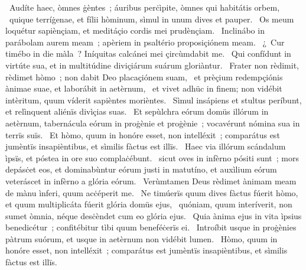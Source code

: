 \psalmChapterWithInscription{}
{ }
{%
~Audíte haec, òmnes ġèntes~; áuribus perċìpite, òmnes qui habitátis orbem, 
~quique terríġenae, et fílii hòminum, sìmul in unum dives et pauper. 
~Os meum loquétur sapiènçiam, et meditáçio cordis mei prudènçiam. 
~Inclinábo in parábolam aurem meam~; apèriem in psaltério proposiçiónem meam. 
~¿~Cur timébo in die màla~? Iníquitas calcánei mei çircùmdabit me. 
~Qui confídunt in virtúte sua, et in multitúdine diviçiárum suárum gloriàntur. 
~Frater non rèdimit, rèdimet hòmo~; non dabit Deo placaçiónem suam, 
~et prèçium redempçiónis ànimae suae, et laborábit in aetèrnum, 
~et vivet adhüc in finem; non vidébit intèritum, quum víderit sapièntes morièntes. 
~Sìmul insápiens et stultus períbunt, et relìnquent aliénïs divìçias suas. 
~Et sepùlchra eórum domüs illórum in aetèrnum, tabernácula eórum in proġènie et proġènie~; vocavérunt nómina sua in terrïs suïs. 
~Et hòmo, quum in honóre esset, non intelléxit~; comparátus est jumèntïs insapièntibus, et sìmilis fàctus est illïs. 
~Haec via illórum scándalum ìpsïs, et póstea in ore suo complaċébunt. 
~sicut oves in infèrno pósiti sunt~; mors depásċet eos, et dominabùntur eórum justi in matutíno, et auxìlium eórum veteráscet in infèrno a glória eórum. 
~Verùmtamen Deus rèdimet ànimam meam de mànu ìnferi, quum acċéperit me. 
~Ne timúerïs quum dives fàctus fúerit hòmo, et quum multiplicáta fúerit glória domüs ejus, 
~quóniam, quum interíverit, non sumet òmnia, néque desċèndet cum eo glória ejus. 
~Quia ànima ejus in vita ìpsius benedicétur~; confitébitur tìbi quum beneféċerïs ei. 
~Introíbit usque in proġènies pàtrum suórum, et usque in aetèrnum non vidébit lumen. 
~Hòmo, quum in honóre esset, non intelléxit~; comparátus est jumèntïs insapièntibus, et sìmilis fàctus est illïs. 
}
